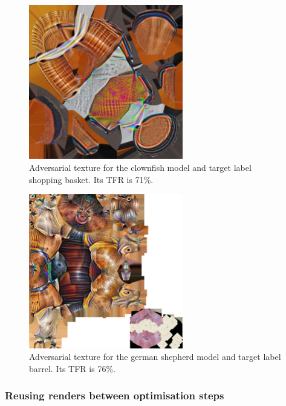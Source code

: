 \begin{figure}[H]
    \centering
    \includegraphics[width=0.6\textwidth]{graphics/clownfish_790_adv_9999.jpg}
    \caption[Adversarial texture for the clownfish model and target label shopping basket.]{Adversarial texture for the clownfish model and target label shopping basket. Its TFR is 71\%.}
    \label{fig:clownfish_noisy_texture}
\end{figure}

\begin{figure}[H]
    \centering
    \includegraphics[width=0.6\textwidth]{graphics/german_shepherd_427_adv_9999.jpg}
    \caption[Adversarial texture for the german shepherd model and target label barrel.]{Adversarial texture for the german shepherd model and target label barrel. Its TFR is 76\%.}
    \label{fig:dog_noisy_texture}
\end{figure}

\subsubsection{Reusing renders between optimisation steps}

